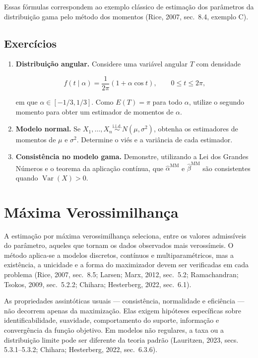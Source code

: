\documentclass[
  letterpaper,
  DIV=11,
  numbers=noendperiod]{scrreprt}
\begin{document}
Essas fórmulas correspondem ao exemplo clássico de estimação dos
parâmetros da distribuição gama pelo método dos momentos (Rice, 2007,
sec.~8.4, exemplo C).

\subsection*{Exercícios}\label{exercuxedcios-2}

\begin{enumerate}
\def\labelenumi{\arabic{enumi}.}
\item
  \textbf{Distribuição angular.} Considere uma variável angular \(T\)
  com densidade

  \[f(t\mid\alpha)=\frac{1}{2\pi}(1+\alpha\cos t),
  \qquad0\leq t\leq2\pi,\]

  em que \(\alpha\in[-1/3,1/3]\). Como \(E(T)=\pi\) para todo
  \(\alpha\), utilize o segundo momento para obter um estimador de
  momentos de \(\alpha\).
\item
  \textbf{Modelo normal.} Se
  \(X_1,\ldots,X_n\overset{\mathrm{i.i.d.}}{\sim}N(\mu,\sigma^2)\),
  obtenha os estimadores de momentos de \(\mu\) e \(\sigma^2\).
  Determine o viés e a variância de cada estimador.
\item
  \textbf{Consistência no modelo gama.} Demonstre, utilizando a Lei dos
  Grandes Números e o teorema da aplicação contínua, que
  \(\widehat\alpha^{\mathrm{MM}}\) e \(\widehat\beta^{\mathrm{MM}}\) são
  consistentes quando \(\operatorname{Var}(X)>0\).
\end{enumerate}

\section{Máxima Verossimilhança}\label{sec-maxima-verossimilhanca}

A estimação por máxima verossimilhança seleciona, entre os valores
admissíveis do parâmetro, aqueles que tornam os dados observados mais
verossímeis. O método aplica-se a modelos discretos, contínuos e
multiparamétricos, mas a existência, a unicidade e a forma do
maximizador devem ser verificadas em cada problema (Rice, 2007,
sec.~8.5; Larsen; Marx, 2012, sec.~5.2; Ramachandran; Tsokos, 2009,
sec.~5.2.2; Chihara; Hesterberg, 2022, sec.~6.1).

As propriedades assintóticas usuais --- consistência, normalidade e
eficiência --- não decorrem apenas da maximização. Elas exigem hipóteses
específicas sobre identificabilidade, suavidade, comportamento do
suporte, informação e convergência da função objetivo. Em modelos não
regulares, a taxa ou a distribuição limite pode ser diferente da teoria
padrão (Lauritzen, 2023, secs. 5.3.1--5.3.2; Chihara; Hesterberg, 2022,
sec.~6.3.6).
\end{document}
